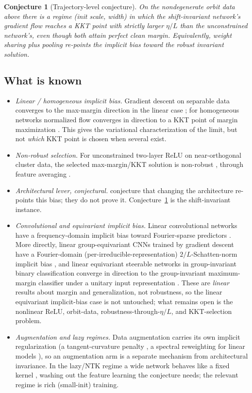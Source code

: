 \documentclass[11pt]{article}
\theoremstyle{plain}
\newtheorem{conjecture}{Conjecture}
\theoremstyle{definition}
\theoremstyle{remark}
\begin{document}
\begin{conjecture}[Trajectory-level conjecture]\label{conj:opt}
On the nondegenerate orbit data above there is a regime (init scale, width) in which the shift-invariant network's gradient flow reaches a KKT point with strictly larger $\eta/L$ than the unconstrained network's, even though both attain perfect clean margin.  Equivalently, weight sharing plus pooling re-points the implicit bias toward the robust invariant solution.
\end{conjecture}

\subsection{What is known}
\begin{itemize}[leftmargin=1.4em]
\item \emph{Linear / homogeneous implicit bias.}  Gradient descent on separable data converges to the max-margin direction in the linear case \citep{Soudry2018}; for homogeneous networks normalized flow converges in direction to a KKT point of margin maximization \citep{Lyu2020,Ji2020}.  This gives the variational characterization of the limit, but not \emph{which} KKT point is chosen when several exist.
\item \emph{Non-robust selection.}  For unconstrained two-layer ReLU on near-orthogonal cluster data, the selected max-margin/KKT solution is non-robust \citep{Frei2023}, through feature averaging \citep{LiFeature2024}.
\item \emph{Architectural lever, conjectural.}  \citet{MinVidal2024} conjecture that changing the architecture re-points this bias; they do not prove it.  Conjecture~\ref{conj:opt} is the shift-invariant instance.
\item \emph{Convolutional and equivariant implicit bias.}  Linear convolutional networks have a frequency-domain implicit bias toward Fourier-sparse predictors \citep{Gunasekar2018}.  More directly, linear group-equivariant CNNs trained by gradient descent have a Fourier-domain (per-irreducible-representation) $2/L$-Schatten-norm implicit bias \citep{Lawrence2021}, and linear equivariant steerable networks in group-invariant binary classification converge in direction to the group-invariant maximum-margin classifier under a unitary input representation \citep{ChenZhu2023}.  These are \emph{linear} results about margin and generalization, not robustness, so the linear equivariant implicit-bias case is not untouched; what remains open is the nonlinear ReLU, orbit-data, robustness-through-$\eta/L$, and KKT-selection problem.
\item \emph{Augmentation and lazy regimes.}  Data augmentation carries its own implicit regularization (a tangent-curvature penalty \citep{LeJeune2019}, a spectral reweighting for linear models \citep{Lin2022}), so an augmentation arm is a separate mechanism from architectural invariance.  In the lazy/NTK regime a wide network behaves like a fixed kernel \citep{Jacot2018,Chizat2018}, washing out the feature learning the conjecture needs; the relevant regime is rich (small-init) training.
\end{itemize}
\end{document}
